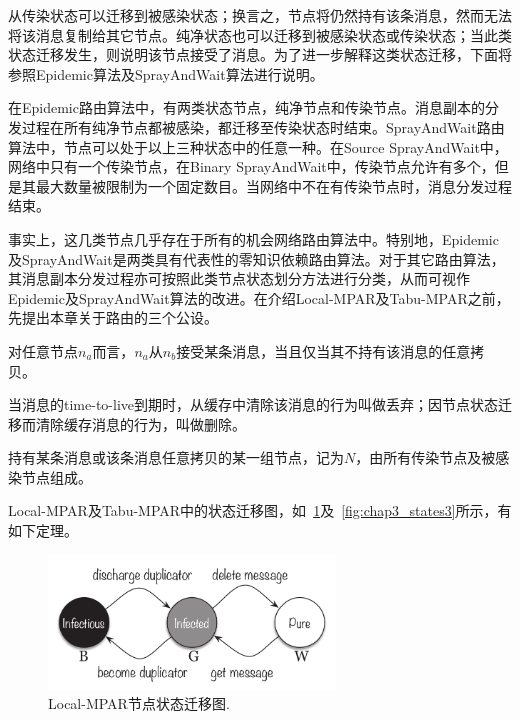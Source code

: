 从传染状态可以迁移到被感染状态；换言之，节点将仍然持有该条消息，然而无法将该消息复制给其它节点。纯净状态也可以迁移到被感染状态或传染状态；当此类状态迁移发生，则说明该节点接受了消息。为了进一步解释这类状态迁移，下面将参照Epidemic算法及SprayAndWait算法进行说明。

在Epidemic路由算法中，有两类状态节点，纯净节点和传染节点。消息副本的分发过程在所有纯净节点都被感染，都迁移至传染状态时结束。SprayAndWait路由算法中，节点可以处于以上三种状态中的任意一种。在Source SprayAndWait中，网络中只有一个传染节点，在Binary SprayAndWait中，传染节点允许有多个，但是其最大数量被限制为一个固定数目。当网络中不在有传染节点时，消息分发过程结束。

事实上，这几类节点几乎存在于所有的机会网络路由算法中。特别地，Epidemic及SprayAndWait是两类具有代表性的零知识依赖路由算法。对于其它路由算法，其消息副本分发过程亦可按照此类节点状态划分方法进行分类，从而可视作Epidemic及SprayAndWait算法的改进。在介绍Local-MPAR及Tabu-MPAR之前，先提出本章关于路由的三个公设。

\begin{postulation}
\label{post:replication}
对任意节点$n_a$而言，$n_a$从$n_b$接受某条消息，当且仅当其不持有该消息的任意拷贝。
\end{postulation}

\begin{postulation}
\label{post:deletion}
当消息的time-to-live到期时，从缓存中清除该消息的行为叫做丢弃；因节点状态迁移而清除缓存消息的行为，叫做删除。
\end{postulation}

\begin{postulation}
持有某条消息或该条消息任意拷贝的某一组节点，记为$N$，由所有传染节点及被感染节点组成。
\end{postulation}

Local-MPAR及Tabu-MPAR中的状态迁移图，如\figurename~\ref{fig:chap3_states2}及\figurename~\ref{fig:chap3_states3}所示，有如下定理。

\begin{figure}[!t]
\centering
\includegraphics[width=3in]{paper-MPAR/states2}
\caption{Local-MPAR节点状态迁移图.}
\label{fig:chap3_states2}
\end{figure}

